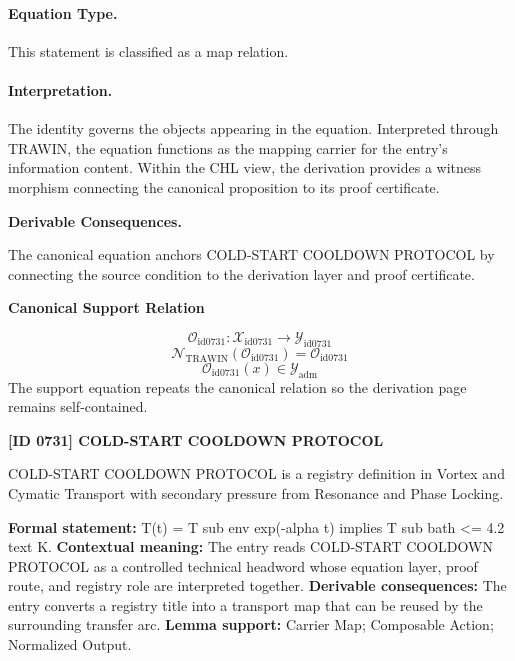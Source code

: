\paragraph{Equation Type.}
This statement is classified as a map relation.

\paragraph{Interpretation.}
The identity governs the objects appearing in the equation. Interpreted through TRAWIN, the equation functions as the mapping carrier for the entry’s information content. Within the CHL view, the derivation provides a witness morphism connecting the canonical proposition to its proof certificate.

\par\vspace{0.35em}
\noindent\textbf{Derivable Consequences.}\quad
\begingroup
\footnotesize
\raggedright
The canonical equation anchors COLD-START COOLDOWN PROTOCOL by connecting the source condition to the derivation layer and proof certificate.
\par\endgroup

\noindent\textbf{Canonical Support Relation}\par
\[
\mathcal{O}_{\mathrm{id0731}}:\mathcal{X}_{\mathrm{id0731}}\longrightarrow\mathcal{Y}_{\mathrm{id0731}}
\]
\[
\mathcal{N}_{\mathrm{TRAWIN}}(\mathcal{O}_{\mathrm{id0731}})=\mathcal{O}_{\mathrm{id0731}}
\]
\[
\mathcal{O}_{\mathrm{id0731}}(x)\in\mathcal{Y}_{\mathrm{adm}}
\]
\noindent The support equation repeats the canonical relation so the derivation page remains self-contained.\par

\clearpage
\noindent\textbf{[ID 0731] COLD-START COOLDOWN PROTOCOL}\par
\vspace{0.35em}
\begingroup\small
{}
COLD-START COOLDOWN PROTOCOL is a registry definition in Vortex and Cymatic Transport with secondary pressure from Resonance and Phase Locking.

\begingroup\footnotesize\setlength{\emergencystretch}{3em}\sloppy
\textbf{Formal statement:} T(t) = T sub env exp(-alpha t) implies T sub bath <= 4.2 text K. \textbf{Contextual meaning:} The entry reads COLD-START COOLDOWN PROTOCOL as a controlled technical headword whose equation layer, proof route, and registry role are interpreted together. \textbf{Derivable consequences:} The entry converts a registry title into a transport map that can be reused by the surrounding transfer arc. \textbf{Lemma support:} Carrier Map; Composable Action; Normalized Output.\par
\endgroup

